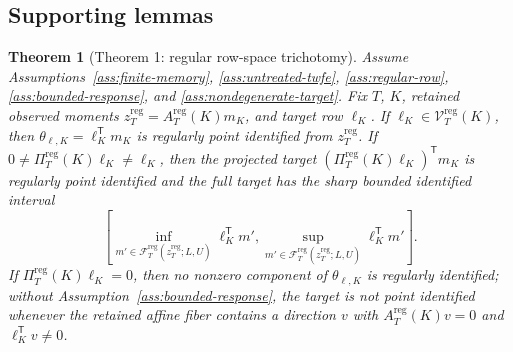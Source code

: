 \documentclass[11pt]{article}
\newcommand{\transpose}{\mathsf{T}}
\theoremstyle{definition}
\theoremstyle{plain}
\newtheorem{theorem}{Theorem}
\theoremstyle{remark}
\begin{document}
\subsection*{Supporting lemmas}
\begin{theorem}[Theorem 1: regular row-space trichotomy]\label{thm:regular-row-trichotomy}
Assume Assumptions~\ref{ass:finite-memory}, \ref{ass:untreated-twfe}, \ref{ass:regular-row}, \ref{ass:bounded-response}, and \ref{ass:nondegenerate-target}.
Fix \(T\), \(K\), retained observed moments \(z_T^{\mathrm{reg}}=A_T^{\mathrm{reg}}(K)m_K\), and target row \(\ell_K\).
If \(\ell_K\in\mathcal V_T^{\mathrm{reg}}(K)\), then \(\theta_{\ell,K}=\ell_K^\transpose m_K\) is regularly point identified from \(z_T^{\mathrm{reg}}\).
If \(0\ne\Pi_T^{\mathrm{reg}}(K)\ell_K\ne\ell_K\), then the projected target \((\Pi_T^{\mathrm{reg}}(K)\ell_K)^\transpose m_K\) is regularly point identified and the full target has the sharp bounded identified interval
\[
\left[
\inf_{m'\in\mathcal F_T^{\mathrm{reg}}(z_T^{\mathrm{reg}};L,U)} \ell_K^\transpose m',
\sup_{m'\in\mathcal F_T^{\mathrm{reg}}(z_T^{\mathrm{reg}};L,U)} \ell_K^\transpose m'
\right].
\]
If \(\Pi_T^{\mathrm{reg}}(K)\ell_K=0\), then no nonzero component of \(\theta_{\ell,K}\) is regularly identified; without Assumption~\ref{ass:bounded-response}, the target is not point identified whenever the retained affine fiber contains a direction \(v\) with \(A_T^{\mathrm{reg}}(K)v=0\) and \(\ell_K^\transpose v\ne0\).
\end{theorem}
\end{document}

